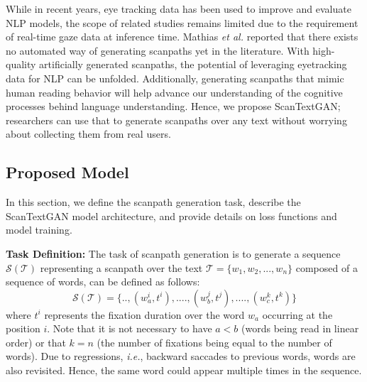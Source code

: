 While in recent years, eye tracking data has been used to improve and evaluate NLP models, the scope of related studies remains limited due to the %
requirement of real-time gaze data at inference time. Mathias \textit{et al.} \cite{ijcaiSurveyGapIdentified} reported that there exists no automated way of generating scanpaths yet in the literature. With high-quality artificially generated scanpaths, the potential of leveraging eyetracking data for NLP can be unfolded. Additionally, generating scanpaths that mimic human reading behavior will help advance our understanding of the cognitive processes behind language understanding. Hence, we propose ScanTextGAN; researchers can use that to generate scanpaths over any text without worrying about collecting them from real users. 


\subsection{Proposed Model}
\label{sec:ProposedModel}
In this section, we define the scanpath generation task, describe the ScanTextGAN model architecture, and provide details on loss functions and model training.

\textbf{Task Definition:} The task of scanpath generation is to generate a sequence $\mathcal{S}(\mathcal{T})$ representing a scanpath over the text $\mathcal{T} = \{w_1,w_2,...,w_n\}$ composed of a sequence of words, can be defined as follows:
\begin{equation}
    \mathcal{S(T)} = \{..,(w_a^i,t^i),....,(w_b^j,t^j),....,(w_c^k,t^k)\}
\end{equation}
where $t^i$ represents the fixation duration over the word $w_a$ occurring at the position $i$.  Note that it is not necessary to have $a<b$ (words being read in linear order) or that $k=n$ (the number of fixations being equal to the number of words). Due to regressions, \textit{i.e.}, backward saccades to previous words, words are also revisited. Hence, the same word could appear multiple times in the sequence.

